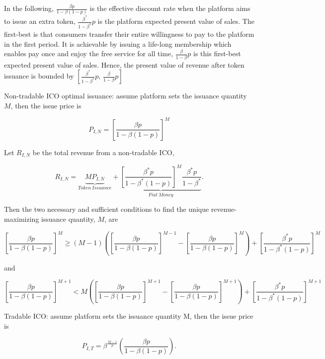 In the following, $\frac{\beta p}{1-\beta(1-p)}$ is the effective discount rate when the platform aims to issue an extra token, $\frac{\beta^* }{1-\beta^*}p$ is the platform expected present value of sales. The first-best is that consumers transfer their entire willingness to pay to the platform in
the first period. It is achievable by issuing a life-long membership which enables pay once and
enjoy the free service for all time, $\frac{\beta}{1-\beta}p$ is this first-best expected present value of sales.  Hence, the present value of revenue after token issuance is bounded by $\left[{\frac{\beta^{*}}{1-\beta^{*}}}p,\,{\frac{\beta}{1-\beta}}p\right]$

Non-tradable ICO optimal issuance: assume platform sets the issuance quantity $M$, then the issue price is

\begin{equation}
    P_{I,N}=\left[\frac{\beta p}{1-\beta(1-p)}\right]^{M}
\end{equation}

Let $R_{I,N}$ be the total revenue from a non-tradable ICO,

\begin{equation}
    R_{I,N} = \underbrace{M P_{I,N}}_{Token~Issuance}
    +
    \underbrace{\left[\frac{\beta^{*}p}{1-\beta^{*}(1-p)}\right]^{M}
    \frac{\beta^{*}p}{1-\beta^{*}}}_{Fiat~Money}.
\end{equation}

Then the two necessary and sufficient conditions to find the unique revenue-maximizing issuance quantity, $M$, are

\begin{equation}
    \left[\frac{\beta p}{1-\beta(1-p)}\right]^{M}\geq(M-1)\left(\left[\frac{\beta p}{1-\beta(1-p)}\right]^{M-1}-\left[\frac{\beta p}{1-\beta(1-p)}\right]^{M}\right)+\left[\frac{\beta^{*}p}{1-\beta^{*}(1-p)}\right]^{M}
\end{equation}

and

\begin{equation}
    \left[\frac{\beta p}{1-\beta(1-p)}\right]^{M+1}<M\left(\left[\frac{\beta p}{1-\beta(1-p)}\right]^{M+1}-\left[\frac{\beta p}{1-\beta(1-p)}\right]^{M+1}\right)+\left[\frac{\beta^{*}p}{1-\beta^{*}(1-p)}\right]^{M+1}
\end{equation}

Tradable ICO: assume platform sets the issuance quantity M, then the issue price is

\begin{equation}
    P_{I,T}=\beta^{\frac{M-1}{p}}\left(\frac{\beta p}{1-\beta(1-p)}\right).
\end{equation}

